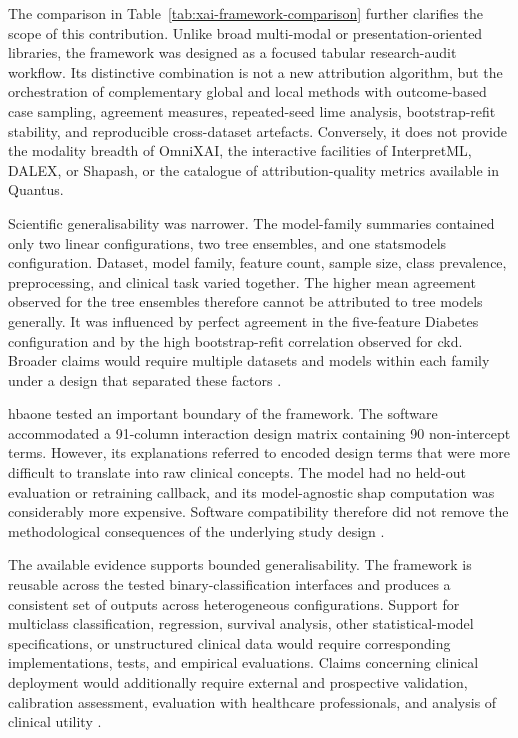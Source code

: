 The comparison in Table~\ref{tab:xai-framework-comparison} further clarifies the scope of this contribution. Unlike broad multi-modal or presentation-oriented libraries, the framework was designed as a focused tabular research-audit workflow. Its distinctive combination is not a new attribution algorithm, but the orchestration of complementary global and local methods with outcome-based case sampling, agreement measures, repeated-seed \gls{lime} analysis, bootstrap-refit stability, and reproducible cross-dataset artefacts. Conversely, it does not provide the modality breadth of OmniXAI, the interactive facilities of InterpretML, DALEX, or Shapash, or the catalogue of attribution-quality metrics available in Quantus.

Scientific generalisability was narrower. The model-family summaries contained only two linear configurations, two tree ensembles, and one statsmodels configuration. Dataset, model family, feature count, sample size, class prevalence, preprocessing, and clinical task varied together. The higher mean agreement observed for the tree ensembles therefore cannot be attributed to tree models generally. It was influenced by perfect agreement in the five-feature Diabetes configuration and by the high bootstrap-refit correlation observed for \gls{ckd}. Broader claims would require multiple datasets and models within each family under a design that separated these factors \citep{mohseni_multidisciplinary_2021, vilone_classification_2021}.

\gls{hbaone} tested an important boundary of the framework. The software accommodated a 91-column interaction design matrix containing 90 non-intercept terms. However, its explanations referred to encoded design terms that were more difficult to translate into raw clinical concepts. The model had no held-out evaluation or retraining callback, and its model-agnostic \gls{shap} computation was considerably more expensive. Software compatibility therefore did not remove the methodological consequences of the underlying study design \citep{strack_impact_2014, NIPS2017_8a20a862, vilone_classification_2021}.

The available evidence supports bounded generalisability. The framework is reusable across the tested binary-classification interfaces and produces a consistent set of outputs across heterogeneous configurations. Support for multiclass classification, regression, survival analysis, other statistical-model specifications, or unstructured clinical data would require corresponding implementations, tests, and empirical evaluations. Claims concerning clinical deployment would additionally require external and prospective validation, calibration assessment, evaluation with healthcare professionals, and analysis of clinical utility \citep{collins_tripodai_2024, moons_probastai_2025, vasey_decideai_2022}.

